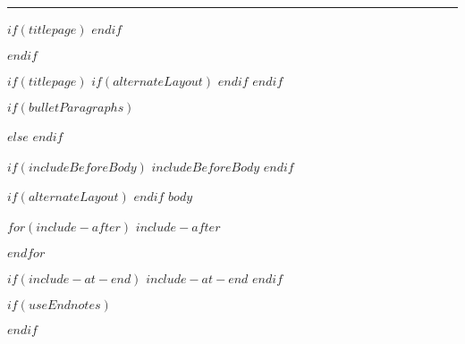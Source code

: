 \documentclass[$if(fontSize)$$fontSize$,%
	$if(language)$$language$,$else$english,$endif$%
	$if(paperSize)$$paperSize$,$else$ a4paper,%
	$endif$$if(classOptions)$$classOptions$,$endif$%
	$if(twoSided)$twoside,$endif$%
	$if(titlepage)$titlepage,$endif$%
	$if(centerEqs)$$else$fleqn$endif$]{$if(documentClass)$%
		$documentClass$$else$article$endif$}
\begin{document}
\noindent\rule{\linewidth}{0.05em}

$if(titlepage)$
\newpage
$endif$


$endif$



$if(titlepage)$
    $if(alternateLayout)$
        \restoregeometry
    $endif$
$endif$

$if(bulletParagraphs)$
\let\oldep\everypar  \newtoks\everypar  \oldep{\the\everypar\hbox{\P}}

\makeatletter
\def\@sect#1#2#3#4#5#6[#7]#8{%
  \ifnum #2>\c@secnumdepth
    \let\@svsec\@empty
  \else
    \refstepcounter{#1}%
    \protected@edef\@svsec{\@seccntformat{#1}\relax}%
  \fi
  \@tempskipa #5\relax
  \ifdim \@tempskipa>\z@
    \begingroup
      #6{%
        \@hangfrom{\hskip #3\relax\@svsec}%
          \interlinepenalty \@M 
\leavevmode \setbox\z@\lastbox\setbox\tw@\lastbox\box\z@
#8\@@par}%
    \endgroup
    \csname #1mark\endcsname{#7}%
    \addcontentsline{toc}{#1}{%
      \ifnum #2>\c@secnumdepth \else
        \protect\numberline{\csname the#1\endcsname}%
      \fi
      #7}%
  \else
    \def\@svsechd{%
      #6{\hskip #3\relax
      \@svsec #8}%
      \csname #1mark\endcsname{#7}%
      \addcontentsline{toc}{#1}{%
        \ifnum #2>\c@secnumdepth \else
          \protect\numberline{\csname the#1\endcsname}%
        \fi
        #7}}%
  \fi
  \@xsect{#5}}

\makeatother
$else$
$endif$


$if(includeBeforeBody)$
    $includeBeforeBody$
$endif$

$if(alternateLayout)$
    \pagestyle{fancy}
$endif$
$body$

$for(include-after)$
$include-after$

$endfor$

$if(include-at-end)$
$include-at-end$
$endif$


$if(useEndnotes)$
\renewcommand{\notesname}{~}



\def\enotesize{\normalsize}
\theendnotes
$endif$
\end{document}

